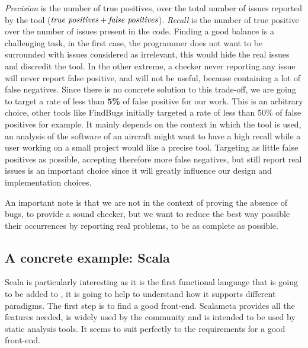 \emph{Precision} is the number of true positives, over the total number of issues reported by the tool ($ \emph{true positives} + \emph{false positives} $). \emph{Recall} is the number of true positive over the number of issues present in the code. 
Finding a good balance is a challenging task, in the first case, the programmer does not want to be surrounded with issues considered as irrelevant, this would hide the real issues and discredit the tool.
In the other extreme, a checker never reporting any issue will never report false positive, and will not be useful, because containing a lot of false negatives. 
Since there is no concrete solution to this trade-off, we are going to target a rate of less than \textbf{5\%} of false positive for our work.
This is an arbitrary choice, other tools like FindBugs \cite{Hovemeyer:2004:FBE:1052883.1052895} initially targeted a rate of less than 50\% of false positives for example. 
It mainly depends on the context in which the tool is used, an analysis of the software of an aircraft might want to have a high recall while a user working on a small project would like a precise tool. 
Targeting as little false positives as possible, accepting therefore more false negatives, but still report real issues is an important choice since it will greatly influence our design and implementation choices.

An important note is that we are not in the context of proving the absence of bugs, to provide a sound checker, but we want to reduce the best way possible their occurrences by reporting real problems, to be as complete as possible.

\subsection{A concrete example: Scala}
\label{subsec:concrete_example}

Scala is particularly interesting as it is the first functional language that is going to be added to \slang{}, it is going to help to understand how it supports different paradigms.
The first step is to find a good front-end.
Scalameta \cite{Scalameta:2019:Online} provides all the features needed, is widely used by the community and is intended to be used by static analysis tools. 
It seems to suit perfectly to the requirements for a good front-end.

